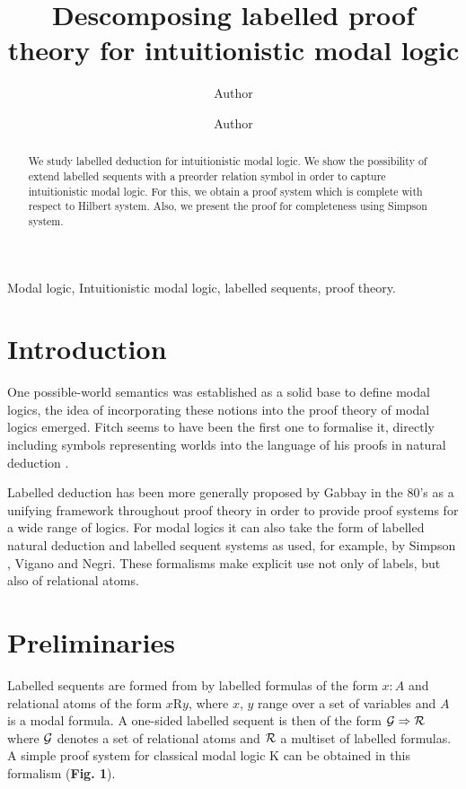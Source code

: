 \documentclass[twoside]{aiml18}
\begin{document}
\begin{frontmatter}
  \title{Descomposing labelled proof theory for intuitionistic modal logic}
  \author{Author}
  \address{Affiliation \\ Address }
 \author{Author}
 \address{Affiliation \\ Address \\ Address}
  
  \begin{abstract}
  We study labelled deduction for intuitionistic modal logic. We show the possibility of extend labelled sequents with a preorder relation symbol in order to capture intuitionistic modal logic. For this, we obtain a proof system which is complete with respect to Hilbert system.  Also, we present the proof for completeness using Simpson system.
  \end{abstract}

  \begin{keyword}
  Modal logic, Intuitionistic modal logic, labelled sequents, proof theory.
  \end{keyword}
 \end{frontmatter}


\section{Introduction}
One possible-world semantics was established as a solid base to define modal logics, the idea of incorporating these notions into the proof theory of modal logics emerged. Fitch seems to have been the first one to formalise it, directly including symbols representing worlds into the language of his proofs in natural deduction \cite{Fitch}.

Labelled deduction has been more generally proposed by Gabbay in the 80’s as a unifying framework throughout proof theory in order to provide proof systems for a wide range of logics. For modal logics it can also take the form of labelled natural deduction and labelled sequent systems as used, for example, by Simpson \cite{Simpson}, Vigano \cite{Vigano} and Negri\cite{Negri}. These formalisms make explicit use not only of labels, but also of relational atoms. 

\section{Preliminaries}

Labelled sequents are formed from by labelled formulas of the form $x \colon A$  and relational atoms of the form $x$R$y$, where $x$, $y$ range over a set of variables and $A$ is a modal formula. A one-sided labelled sequent is then of the form $\mathcal{G} \Rightarrow \mathcal{R}$ where $\mathcal{G}$ denotes a set of relational atoms and $\mathcal{R}$ a multiset of labelled formulas. A simple proof system for classical modal logic K can be obtained in this formalism (\textbf{Fig. 1}). 
\end{document}

